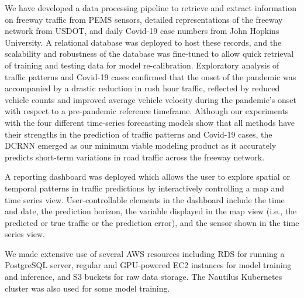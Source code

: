 \documentclass{article}
\begin{document}
We have developed a data processing pipeline to retrieve and extract information on freeway traffic from PEMS sensors, 
detailed representations of the freeway network from USDOT, and daily Covid-19 case numbers from John Hopkins University.
A relational database was deployed to host these records, and the scalability and robustness of the
database was fine-tuned to allow quick retrieval of training and testing data for model re-calibration.
Exploratory analysis of traffic patterns and Covid-19 cases confirmed that the onset of the pandemic was accompanied
by a drastic reduction in rush hour traffic, reflected by reduced vehicle counts and improved average vehicle velocity
during the pandemic's onset with respect to a pre-pandemic reference timeframe.
Although our experiments with the four different time-series forecasting models show that all methods have their strengths
in the prediction of traffic patterns and Covid-19 cases, the DCRNN  emerged 
as our minimum viable modeling product as it accurately predicts short-term variations in road traffic across the freeway 
network.

A reporting dashboard was deployed which allows the user to explore spatial or temporal 
patterns in traffic predictions by interactively controlling a map and time series view.
User-controllable elements in the dashboard include the time and date, the prediction horizon, 
the variable displayed in the map view
(i.e., the predicted or true traffic or the prediction error), and the sensor shown in the time series view.

We made extensive use of several AWS resources including RDS for running a PostgreSQL server, regular and GPU-powered EC2 
instances for model training and inference, and S3 buckets for raw data storage.  
The Nautilus Kubernetes cluster was also used for some model training.

\printbibliography
% 



\end{document}
